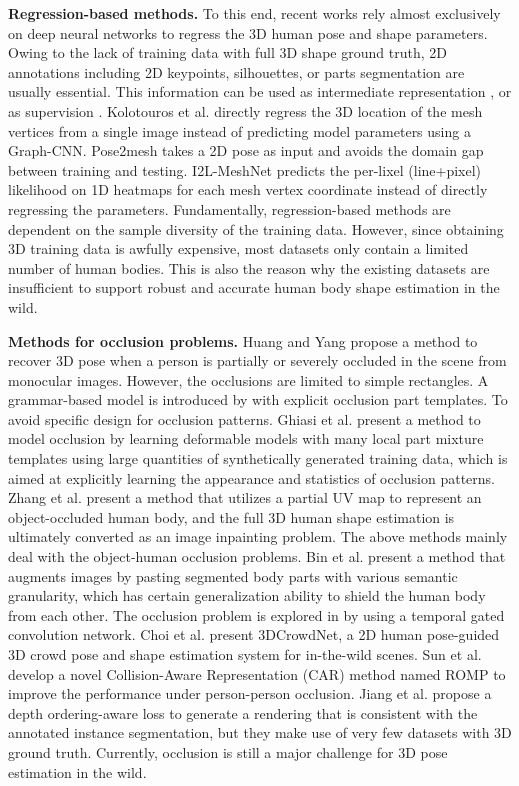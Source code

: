 \documentclass[journal]{IEEEtran}
\begin{document}
\noindent\textbf{Regression-based methods.} To this end, recent works rely almost exclusively on deep neural networks to regress the 3D human pose and shape parameters. Owing to the lack of training data with full 3D shape ground truth, 2D annotations including 2D keypoints, silhouettes, or parts segmentation are usually essential. This information can be used as intermediate representation \cite{kato2018neural,xu2019denserac}, or as supervision \cite{pavlakos2018learning,kato2018neural}. Kolotouros et al. \cite{kolotouros2019convolutional} directly regress the 3D location of the mesh vertices from a single image instead of predicting model parameters using a Graph-CNN. Pose2mesh \cite{Choi_2020_ECCV_Pose2Mesh} takes a 2D pose as input and avoids the domain gap between training and testing. I2L-MeshNet \cite{Moon_2020_ECCV_I2L-MeshNet} predicts the
per-lixel (line+pixel) likelihood on 1D heatmaps for each mesh vertex coordinate instead of directly regressing the parameters. Fundamentally, regression-based methods are dependent on the sample diversity of the training data. However, since obtaining 3D training data is awfully expensive, most datasets only contain  a limited number of human bodies. This is also the reason why the existing datasets are insufficient to support robust and accurate human body shape estimation in the wild.

\noindent\textbf{Methods for occlusion problems.} Huang and Yang \cite{huang2009estimating} propose a method to recover 3D pose when a person is partially or severely occluded in the scene from monocular images. However, the occlusions are limited to simple rectangles. A grammar-based model is introduced by \cite{girshick2011object} with explicit occlusion part templates. To avoid specific design for occlusion patterns. Ghiasi et al. \cite{ghiasi2014parsing} present a method to model occlusion by learning deformable models with many local part mixture templates using large quantities of synthetically generated training data, which is aimed at explicitly learning the appearance and statistics of occlusion patterns. Zhang et al. \cite{zhang2020object} present a method that utilizes a partial UV map to represent an object-occluded human body, and the full 3D human shape estimation is ultimately converted as an image inpainting problem. The above methods mainly deal with the object-human occlusion problems. Bin et al. \cite{bin2020adversarial} present a method that augments images by pasting segmented body parts with various semantic granularity, which has certain generalization ability to shield the human body from each other. The occlusion problem is explored in \cite{gu2021exploring} by using a temporal gated convolution network. Choi et al. \cite{lin2021end-to-end} present 3DCrowdNet, a 2D human pose-guided 3D crowd pose and shape estimation system for in-the-wild scenes. Sun et al. \cite{ROMP} develop a novel Collision-Aware Representation (CAR) method named ROMP to improve the performance under person-person occlusion. Jiang et al. \cite{jiang2020coherent} propose a depth ordering-aware loss to generate a rendering that is consistent with the annotated instance segmentation, but they make use of very few datasets with 3D ground truth. Currently, occlusion is still a major challenge for 3D pose estimation in the wild.  
\end{document}
